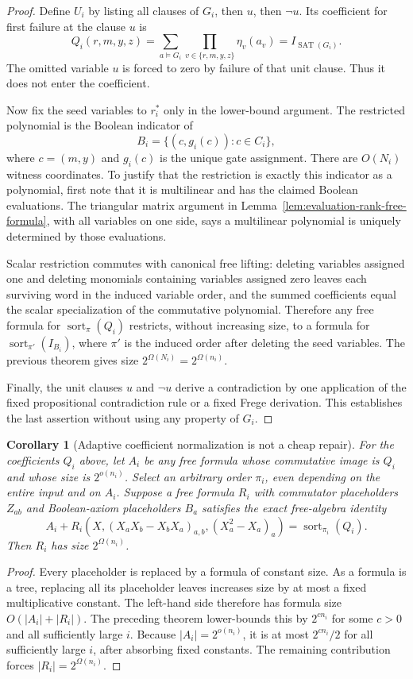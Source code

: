 \documentclass[11pt]{article}
\newtheorem{corollary}[theorem]{Corollary}
\theoremstyle{definition}
\theoremstyle{remark}
\begin{document}
\begin{proof}
Define $U_i$ by listing all clauses of $G_i$, then $u$, then
$\neg u$. Its coefficient for first failure at the clause $u$ is
\[
 Q_i(r,m,y,z)=
 \sum_{a\models G_i}\prod_{v\in\{r,m,y,z\}}\eta_v(a_v)
 =I_{\operatorname{SAT}(G_i)}.
\]
The omitted variable $u$ is forced to zero by failure of that unit
clause. Thus it does not enter the coefficient.

Now fix the seed variables to $r_i^*$ only in the lower-bound
argument. The restricted polynomial is the Boolean indicator of
\[
 B_i=\{(c,g_i(c)):c\in C_i\},
\]
where $c=(m,y)$ and $g_i(c)$ is the unique gate assignment.
There are $O(N_i)$ witness coordinates. To justify that the
restriction is exactly this indicator as a polynomial, first note
that it is multilinear and has the claimed Boolean evaluations.
The triangular matrix argument in
Lemma~\ref{lem:evaluation-rank-free-formula}, with all variables
on one side, says a multilinear polynomial is uniquely determined
by those evaluations.

Scalar restriction commutes with canonical free lifting: deleting
variables assigned one and deleting monomials containing variables
assigned zero leaves each surviving word in the induced variable
order, and the summed coefficients equal the scalar specialization
of the commutative polynomial. Therefore any free formula for
$\operatorname{sort}_{\pi}(Q_i)$ restricts, without increasing
size, to a formula for
$\operatorname{sort}_{\pi'}(I_{B_i})$, where $\pi'$ is the
induced order after deleting the seed variables. The previous
theorem gives size $2^{\Omega(N_i)}=2^{\Omega(n_i)}$.

Finally, the unit clauses $u$ and $\neg u$ derive a contradiction
by one application of the fixed propositional contradiction rule
or a fixed Frege derivation. This establishes the last assertion
without using any property of $G_i$.
\end{proof}

\begin{corollary}[Adaptive coefficient normalization is not a cheap repair]
\label{cor:adaptive-normalization-barrier}
For the coefficients $Q_i$ above, let $A_i$ be any free formula
whose commutative image is $Q_i$ and whose size is
$2^{o(n_i)}$. Select an arbitrary order $\pi_i$, even depending
on the entire input and on $A_i$. Suppose a free formula $R_i$
with commutator placeholders $Z_{ab}$ and Boolean-axiom
placeholders $B_a$ satisfies the exact free-algebra identity
\[
 A_i+R_i(X,(X_aX_b-X_bX_a)_{a,b},(X_a^2-X_a)_a)
   =\operatorname{sort}_{\pi_i}(Q_i).
\]
Then $R_i$ has size $2^{\Omega(n_i)}$.
\end{corollary}
\begin{proof}
Every placeholder is replaced by a formula of constant size.
As a formula is a tree, replacing all its placeholder leaves
increases size by at most a fixed multiplicative constant.
The left-hand side therefore has formula size
$O(|A_i|+|R_i|)$. The preceding theorem lower-bounds this by
$2^{cn_i}$ for some $c>0$ and all sufficiently large $i$.
Because $|A_i|=2^{o(n_i)}$, it is at most $2^{cn_i}/2$ for all
sufficiently large $i$, after absorbing fixed constants. The
remaining contribution forces $|R_i|=2^{\Omega(n_i)}$.
\end{proof}
\end{document}
